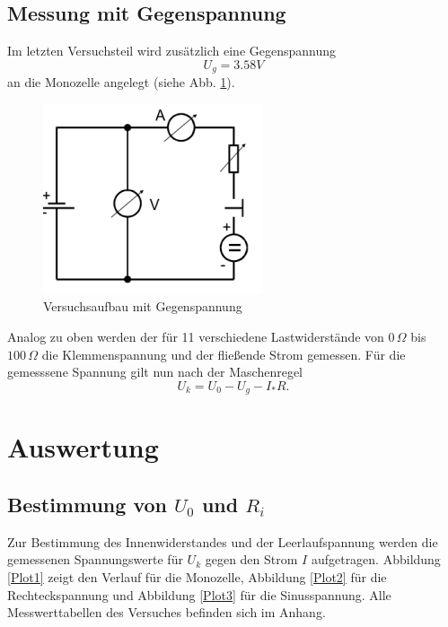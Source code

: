 \documentclass[11pt]{article}
\begin{document}
\subsection{Messung mit Gegenspannung}
Im letzten Versuchsteil wird zus\"atzlich eine Gegenspannung 
\[
U_g = 3.58 V 
\] an die Monozelle angelegt (siehe Abb. \ref{Aufbau2}). 
\begin{figure}[htp]
\centering
\includegraphics[scale=1.00]{abb2.png}
\caption{Versuchsaufbau mit Gegenspannung}
\label{Aufbau2}
\end{figure}Analog zu oben werden der f\"ur 11 verschiedene Lastwiderst\"ande von $0\,\Omega$ bis $100\,\Omega$ die Klemmenspannung und der flie\ss ende Strom gemessen. F\"ur die gemesssene Spannung gilt nun nach der Maschenregel
\begin{equation}
U_k = U_0 - U_g - I_*R.
\end{equation}
\section{Auswertung}


\subsection{Bestimmung von $U_0$ und $R_i$}
Zur Bestimmung des Innenwiderstandes und der Leerlaufspannung werden die gemessenen Spannungswerte f\"ur $U_k$ gegen den Strom $I$ aufgetragen. Abbildung \ref{Plot1} zeigt den Verlauf f\"ur die Monozelle, Abbildung \ref{Plot2} f\"ur die Rechteckspannung und Abbildung \ref{Plot3} f\"ur die Sinusspannung. Alle Messwerttabellen des Versuches befinden sich im Anhang.


 
\end{document}

